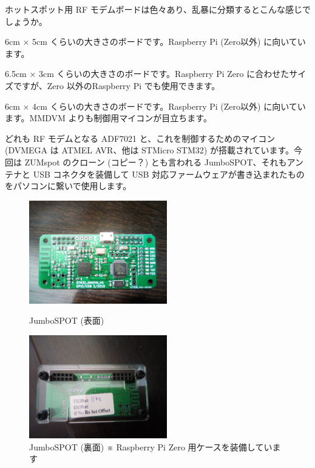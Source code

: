 \documentclass[a4j,oneside]{ujbook}
\begin{document}
ホットスポット用 RF モデムボードは色々あり、乱暴に分類するとこんな感じでしょうか。
\begin{description}[style=nextline]
 \item[MMDVM] 6cm × 5cm くらいの大きさのボードです。Raspberry Pi (Zero以外) に向いています。
 \item[ZUMspot/JumboSPOT] 6.5cm × 3cm くらいの大きさのボードです。Raspberry Pi Zero に合わせたサイズですが、Zero 以外のRaspberry Pi でも使用できます。
 \item[DVMEGA] 6cm × 4cm くらいの大きさのボードです。Raspberry Pi (Zero以外) に向いています。MMDVM よりも制御用マイコンが目立ちます。
\end{description}
どれも RF モデムとなる ADF7021 と、これを制御するためのマイコン (DVMEGA は ATMEL AVR、他は STMicro STM32) が搭載されています。今回は ZUMspot のクローン (コピー？) とも言われる JumboSPOT、それもアンテナと USB コネクタを装備して USB 対応ファームウェアが書き込まれたものをパソコンに繋いで使用します。

\begin{figure}[H]
 \begin{minipage}[t]{0.5\hsize}
  \centering
  \includegraphics[width=6cm]{img/img_20190403_133143.jpg}
  \caption{JumboSPOT (表面)}
 \end{minipage}
 \begin{minipage}[t]{0.5\hsize}
  \centering
  \includegraphics[width=6cm]{img/img_20190619_093448.jpg}
  \caption{JumboSPOT (裏面) \newline ※ Raspberry Pi Zero 用ケースを装備しています}
 \end{minipage}
\end{figure}
\end{document}
